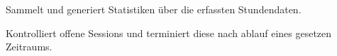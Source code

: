 \begin{itemize}
\begin{itemize}
                        Sammelt und generiert Statistiken über die erfassten Stundendaten.
                        \begin{itemize}
                        \end{itemize}

                        Kontrolliert offene Sessions und terminiert diese nach ablauf eines gesetzen Zeitraums.
                        \begin{itemize}
                        \end{itemize}
                \end{itemize}

            \begin{itemize}
                 \itm{}
            \end{itemize}

        \end{itemize}

